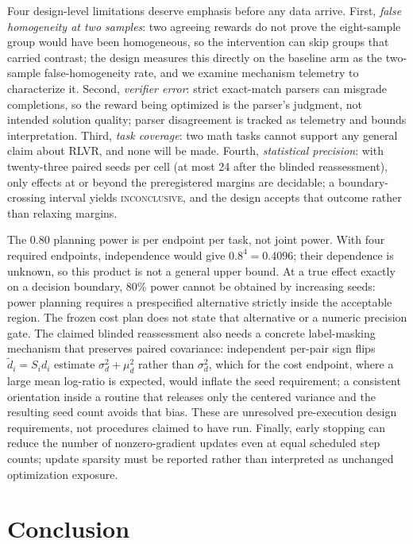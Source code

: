 \documentclass[11pt]{article}
\begin{document}
Four design-level limitations deserve emphasis before any data arrive. First, \emph{false homogeneity at two samples}: two agreeing rewards do not prove the eight-sample group would have been homogeneous, so the intervention can skip groups that carried contrast; the design measures this directly on the baseline arm as the two-sample false-homogeneity rate, and we examine mechanism telemetry to characterize it. Second, \emph{verifier error}: strict exact-match parsers can misgrade completions, so the reward being optimized is the parser's judgment, not intended solution quality; parser disagreement is tracked as telemetry and bounds interpretation. Third, \emph{task coverage}: two math tasks cannot support any general claim about RLVR, and none will be made. Fourth, \emph{statistical precision}: with twenty-three paired seeds per cell (at most 24 after the blinded reassessment), only effects at or beyond the preregistered margins are decidable; a boundary-crossing interval yields \textsc{inconclusive}, and the design accepts that outcome rather than relaxing margins.

The $0.80$ planning power is per endpoint per task, not joint power. With
four required endpoints, independence would give $0.8^4=0.4096$; their
dependence is unknown, so this product is not a general upper bound. At a
true effect exactly on a decision boundary, 80\% power cannot be obtained by
increasing seeds: power planning requires a prespecified alternative strictly
inside the acceptable region. The frozen cost plan does not state that
alternative or a numeric precision gate. The claimed blinded reassessment
also needs a concrete label-masking mechanism that preserves paired
covariance: independent per-pair sign flips $\tilde d_i=S_id_i$ estimate
$\sigma_d^2+\mu_d^2$ rather than $\sigma_d^2$, which for the cost endpoint, where
a large mean log-ratio is expected, would inflate the seed requirement; a
consistent orientation inside a routine that releases only the centered
variance and the resulting seed count avoids that bias. These are unresolved pre-execution design requirements, not
procedures claimed to have run. Finally, early stopping can reduce the
number of nonzero-gradient updates even at equal scheduled step counts;
update sparsity must be reported rather than interpreted as unchanged
optimization exposure.

\section{Conclusion}
\label{sec:conclusion}
\end{document}
